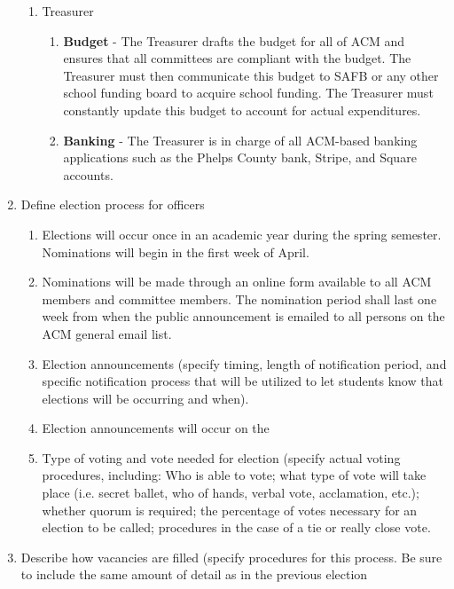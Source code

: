 \documentclass[11pt,a4paper,notitlepage]{article}
\begin{document}
\begin{enumerate}[label=\Alph*.]
\begin{enumerate}[label=\arabic*.]
      \item Treasurer
        \begin{enumerate}[label=\alph*.]
          \item \textbf{Budget} - The Treasurer drafts the budget for all of ACM
            and ensures that all committees are compliant with the budget. The
            Treasurer must then communicate this budget to SAFB or any other
            school funding board to acquire school funding. The Treasurer must
            constantly update this budget to account for actual expenditures.
          \item \textbf{Banking} - The Treasurer is in charge of all ACM-based
            banking applications such as the Phelps County bank, Stripe, and
            Square accounts.
        \end{enumerate}
    \end{enumerate}
  \item Define election process for officers
    \begin{enumerate}[label=\arabic*.]
      \item Elections will occur once in an academic year during the spring
      semester. Nominations will begin in the first week of April.
      \item Nominations will be made through an online form available to all ACM
      members and committee members. The nomination period shall last one week
      from when the public announcement is emailed to all persons on the ACM
      general email list.
      \item Election announcements (specify timing, length of notification
      period, and specific notification process that will be utilized to let
      students know that elections will be occurring and when).
      \item Election announcements will occur on the 
      \item Type of voting and vote needed for election (specify actual voting
      procedures, including:  Who is able to vote; what type of vote will take
      place (i.e. secret ballet, who of hands, verbal vote, acclamation, etc.);
      whether quorum is required; the percentage of votes necessary for an
      election to be called; procedures in the case of a tie or really close
      vote.
    \end{enumerate}
  \item Describe how vacancies are filled (specify procedures for this process.
  Be sure to include the same amount of detail as in the previous election

\end{enumerate}
\end{document}
